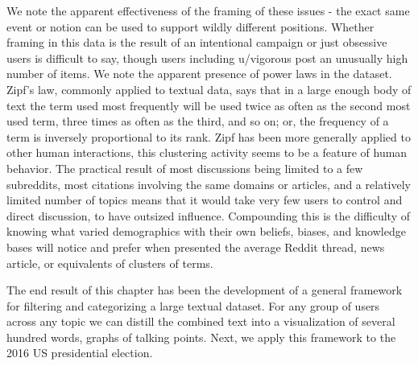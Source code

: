 We note the apparent effectiveness of the framing of these issues - the exact same event or notion can be used to support wildly different positions.
Whether framing in this data is the result of an intentional campaign or just obsessive users is difficult to say, though users including u/vigorous post an unusually high number of items.
We note the apparent presence of power laws in the dataset.
Zipf's law, commonly applied to textual data, says that in a large enough body of text the term used most frequently will be used twice as often as the second most used term, three times as often as the third, and so on; or, the frequency of a term is inversely proportional to its rank.
Zipf has been more generally applied to other human interactions, this clustering activity seems to be a feature of human behavior.
The practical result of most discussions being limited to a few subreddits, most citations involving the same domains or articles, and a relatively limited number of topics means that it would take very few users to control and direct discussion, to have outsized influence.
Compounding this is the difficulty of knowing what varied demographics with their own beliefs, biases, and knowledge bases will notice and prefer when presented the average Reddit thread, news article, or equivalents of clusters of terms.

The end result of this chapter has been the development of a general framework for filtering and categorizing a large textual dataset.
For any group of users across any topic we can distill the combined text into a visualization of several hundred words, graphs of talking points.
Next, we apply this framework to the 2016 US presidential election.
